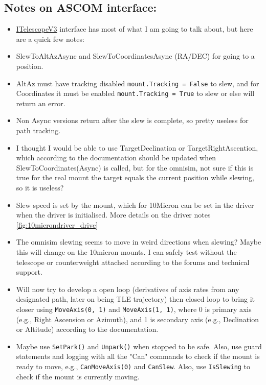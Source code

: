 \documentclass[../main.tex]{subfiles}
\begin{document}
\subsection{Notes on ASCOM interface:}
\begin{itemize}
    \item \href{https://ascom-standards.org/Help/Developer/html/T_ASCOM_DeviceInterface_ITelescopeV3.htm}{ITelescopeV3} interface has most of what I am going to talk about, but here are a quick few notes:
    \item SlewToAltAzAsync and SlewToCoordinatesAsync (RA/DEC) for going to a position.
    \item AltAz must have tracking disabled \verb|mount.Tracking = False| to slew, and for Coordinates it must be enabled \verb|mount.Tracking = True| to slew or else will return an error.
    \item Non Async versions return after the slew is complete, so pretty useless for path tracking.
    \item I thought I would be able to use TargetDeclination or TargetRightAscention, which according to the documentation should be updated when SlewToCoordinates(Async) is called, but for the omnisim, not sure if this is true for the real mount the target equals the current position while slewing, so it is useless?
    \item Slew speed is set by the mount, which for 10Micron can be set in the driver when the driver is initialised. More details on the driver notes \cref{fig:10microndriver_drive}
    \item The omnisim slewing seems to move in weird directions when slewing? Maybe this will change on the 10micron mounts. I can safely test without the telescope or counterweight attached according to the forums and technical support.
    \item Will now try to develop a open loop (derivatives of axis rates from any designated path, later on being TLE trajectory) then closed loop to bring it closer using \verb|MoveAxis(0, 1)| and \verb|MoveAxis(1, 1)|, where 0 is primary axis  (e.g., Right Ascension or Azimuth), and 1 is secondary axis  (e.g., Declination or Altitude) according to the documentation.
    \item Maybe use \verb|SetPark()| and \verb|Unpark()| when stopped to be safe. Also, use guard statements and logging with all the "Can" commands to check if the mount is ready to move, e.g., \verb|CanMoveAxis(0)| and \verb|CanSlew|. Also, use \verb|IsSlewing| to check if the mount is currently moving.
\end{itemize}
\end{document}
